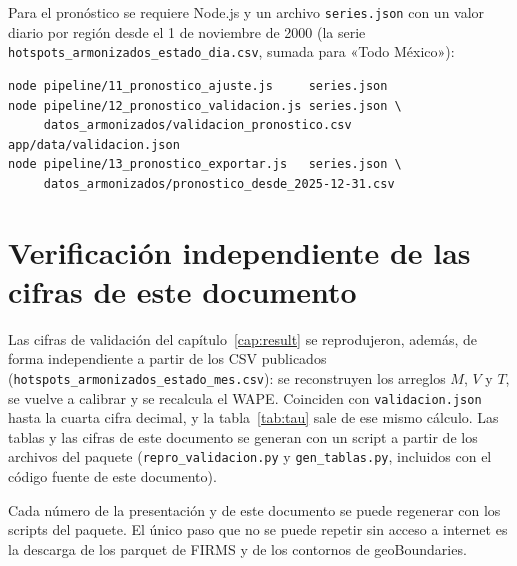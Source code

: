 Para el pronóstico se requiere Node.js y un archivo \texttt{series.json} con un valor diario por región desde el 1 de noviembre de 2000 (la serie \texttt{hotspots\_armonizados\_estado\_dia.csv}, sumada para «Todo México»):
\begin{verbatim}
node pipeline/11_pronostico_ajuste.js     series.json
node pipeline/12_pronostico_validacion.js series.json \
     datos_armonizados/validacion_pronostico.csv app/data/validacion.json
node pipeline/13_pronostico_exportar.js   series.json \
     datos_armonizados/pronostico_desde_2025-12-31.csv
\end{verbatim}

\section{Verificación independiente de las cifras de este documento}

Las cifras de validación del capítulo~\ref{cap:result} se reprodujeron, además, de forma independiente a partir de los CSV publicados (\texttt{hotspots\_armonizados\_estado\_mes.csv}): se reconstruyen los arreglos $M$, $V$ y $T$, se vuelve a calibrar y se recalcula el WAPE. Coinciden con \texttt{validacion.json} hasta la cuarta cifra decimal, y la tabla~\ref{tab:tau} sale de ese mismo cálculo. Las tablas y las cifras de este documento se generan con un script a partir de los archivos del paquete (\texttt{repro\_validacion.py} y \texttt{gen\_tablas.py}, incluidos con el código fuente de este documento).

\begin{ideaclave}
Cada número de la presentación y de este documento se puede regenerar con los scripts del paquete. El único paso que no se puede repetir sin acceso a internet es la descarga de los parquet de FIRMS y de los contornos de geoBoundaries.
\end{ideaclave}
